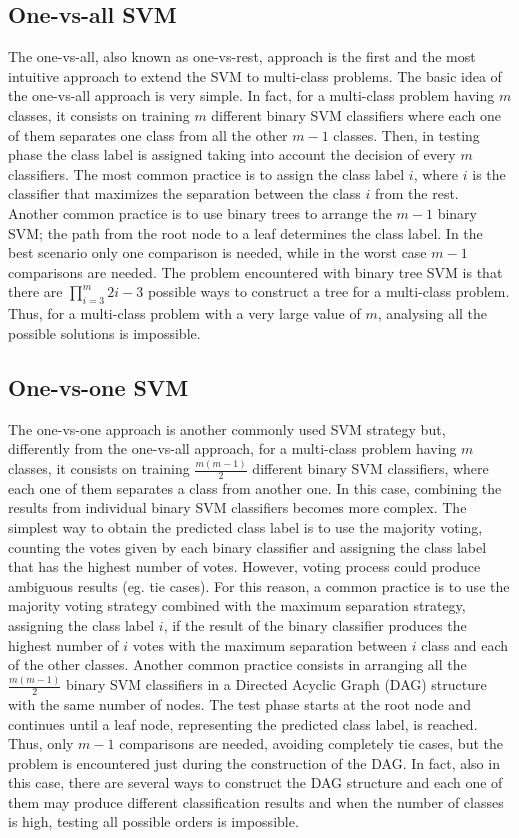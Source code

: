 \documentclass[final,a4paper,12pt,english]{UnicaPhdThesis3}
\begin{document}
	\subsection{One-vs-all SVM} 
	The one-vs-all, also known as one-vs-rest, approach is the first and the most intuitive approach to extend the SVM to multi-class problems. The basic idea of the one-vs-all approach is very simple. In fact, for a multi-class problem having $m$ classes, it consists on training $m$ different binary SVM classifiers where each one of them separates one class from all the other $m-1$ classes. Then, in testing phase the class label is assigned taking into account the decision of every $m$ classifiers. The most common practice is to assign the class label $i$, where $i$ is the classifier that maximizes the separation between the class $i$ from the rest. Another common practice is to use binary trees to arrange the $m-1$ binary SVM; the path from the root node to a leaf determines the class label. In the best scenario only one comparison is needed, while in the worst case  $m-1$ comparisons are needed. The problem encountered with binary tree SVM is that there are $\prod_{i=3}^{m}2i-3$ possible ways to construct a tree for a multi-class problem. Thus, for a multi-class problem with a very large value of $m$, analysing all the possible solutions is impossible.
	
	\subsection{One-vs-one SVM}
	The one-vs-one approach is another commonly used SVM strategy but, differently from the one-vs-all approach, for a multi-class problem having $m$ classes, it consists on training $\frac{m(m-1)}{2}$ different binary SVM classifiers, where each one of them separates a class from another one. In this case, combining the results from individual binary SVM classifiers becomes more complex. The simplest way to obtain the predicted class label is to use the majority voting, counting the votes given by each binary classifier and assigning the class label that has the highest number of votes. However, voting process could produce ambiguous results (eg. tie cases). For this reason, a common practice is to use the majority voting strategy combined with the maximum separation strategy, assigning the class label $i$, if the result of the binary classifier produces the highest number of $i$ votes with the maximum separation between $i$ class and each of the other classes. Another common practice consists in arranging all the $\frac{m(m-1)}{2}$ binary SVM classifiers in a Directed Acyclic Graph (\acs{DAG}) structure with the same number of nodes. The test phase starts at the root node and continues until a leaf node, representing the predicted class label, is reached. Thus, only $m-1$ comparisons are needed, avoiding completely tie cases, but the problem is encountered just during the construction of the DAG. In fact, also in this case, there are several ways to construct the DAG structure and each one of them may produce different classification results and when the number of classes is high, testing all possible orders is impossible.
	
\end{document}
